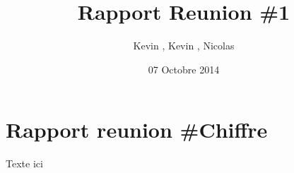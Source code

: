 \documentclass{article}
\title{Rapport Reunion \#1}
\author{Kevin \bsc{Bascol}, Kevin \bsc{Laoussing}, Nicolas \bsc{Reynaud}}
\date{07 Octobre 2014}
\begin{document}
\maketitle
\newpage

\renewcommand{\contentsname}{Sommaire}
\tableofcontents
\newpage

\section{Rapport reunion \#Chiffre}
Texte ici
\end{document}
